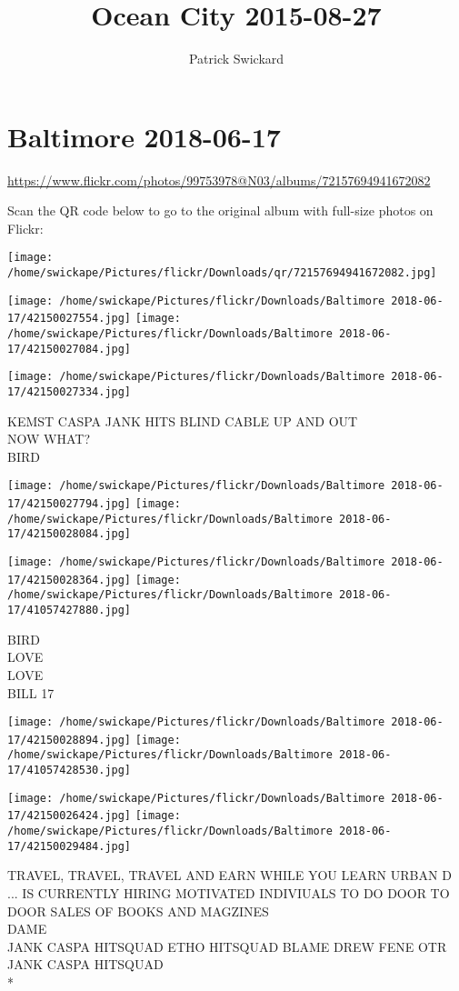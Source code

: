 \documentclass[10pt,letterpaper]{article}
\title{Ocean City 2015-08-27}
\author{Patrick Swickard}
\date{}
\begin{document}
\section*{Baltimore 2018-06-17}

\url{https://www.flickr.com/photos/99753978@N03/albums/72157694941672082}

Scan the QR code below to go to the original album with full-size photos on Flickr:

\texttt{[image: /home/swickape/Pictures/flickr/Downloads/qr/72157694941672082.jpg]}
\pagebreak

\texttt{[image: /home/swickape/Pictures/flickr/Downloads/Baltimore 2018-06-17/42150027554.jpg]}
\texttt{[image: /home/swickape/Pictures/flickr/Downloads/Baltimore 2018-06-17/42150027084.jpg]}

\vspace{0.25in}
\texttt{[image: /home/swickape/Pictures/flickr/Downloads/Baltimore 2018-06-17/42150027334.jpg]}

KEMST CASPA JANK HITS BLIND CABLE UP AND OUT\\
NOW WHAT?\\
BIRD
\pagebreak

\texttt{[image: /home/swickape/Pictures/flickr/Downloads/Baltimore 2018-06-17/42150027794.jpg]}
\texttt{[image: /home/swickape/Pictures/flickr/Downloads/Baltimore 2018-06-17/42150028084.jpg]}

\texttt{[image: /home/swickape/Pictures/flickr/Downloads/Baltimore 2018-06-17/42150028364.jpg]}
\texttt{[image: /home/swickape/Pictures/flickr/Downloads/Baltimore 2018-06-17/41057427880.jpg]}

BIRD\\
LOVE\\
LOVE\\
BILL 17
\pagebreak

\texttt{[image: /home/swickape/Pictures/flickr/Downloads/Baltimore 2018-06-17/42150028894.jpg]}
\texttt{[image: /home/swickape/Pictures/flickr/Downloads/Baltimore 2018-06-17/41057428530.jpg]}

\texttt{[image: /home/swickape/Pictures/flickr/Downloads/Baltimore 2018-06-17/42150026424.jpg]}
\texttt{[image: /home/swickape/Pictures/flickr/Downloads/Baltimore 2018-06-17/42150029484.jpg]}

TRAVEL, TRAVEL, TRAVEL AND EARN WHILE YOU LEARN URBAN D ... IS CURRENTLY HIRING MOTIVATED INDIVIUALS TO DO DOOR TO DOOR SALES OF BOOKS AND MAGZINES\\
DAME\\
JANK CASPA HITSQUAD ETHO HITSQUAD BLAME DREW FENE OTR JANK CASPA HITSQUAD\\
*
\pagebreak
\end{document}
